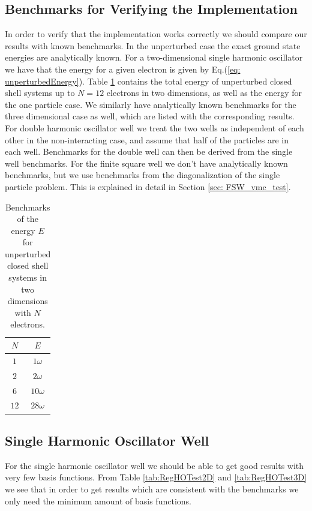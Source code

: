 \documentclass[../main.tex]{subfiles}
\begin{document}
\subsection{Benchmarks for Verifying the Implementation}
In order to verify that the implementation works correctly we should compare our results with known benchmarks. In the unperturbed case the exact ground state energies are analytically known. For a two-dimensional single harmonic oscillator we have that the energy for a given electron is given by Eq.(\ref{eq: unperturbedEnergy}). Table \ref{tab: unperturbedEnergies} contains the total energy of unperturbed closed shell systems up to $N=12$ electrons in two dimensions, as well as the energy for the one particle case. We similarly have analytically known benchmarks for the three dimensional case as well, which are listed with the corresponding results. For double harmonic oscillator well we treat the two wells as independent of each other in the non-interacting case, and assume that half of the particles are in each well. Benchmarks for the double well can then be derived from the single well benchmarks. For the finite square well we don't have analytically known benchmarks, but we use benchmarks from the diagonalization of the single particle problem. This is explained in detail in Section \ref{sec: FSW_vmc_test}.
\begin{table}[!ht]
  \centering
  \begin{tabular}{ | c | c | }
    \hline
     $N$ & $E$ \\*
    \hline
     $1$ & $1\omega$ \\*
    \hline
     $2$ & $2\omega$ \\*
    \hline
     $6$ & $10\omega$ \\*
    \hline
    $12$ & $28\omega$ \\*
    \hline
  \end{tabular}
  \caption{Benchmarks of the energy $E$ for unperturbed closed shell systems in two dimensions with $N$ electrons.}
  \label{tab: unperturbedEnergies}
\end{table}

\subsection{Single Harmonic Oscillator Well}\label{sec:testSHO}

For the single harmonic oscillator well we should be able to get good results with very few basis functions. From Table \ref{tab:RegHOTest2D} and \ref{tab:RegHOTest3D} we see that in order to get results which are consistent with the benchmarks we only need the minimum amount of basis functions.
\end{document}
